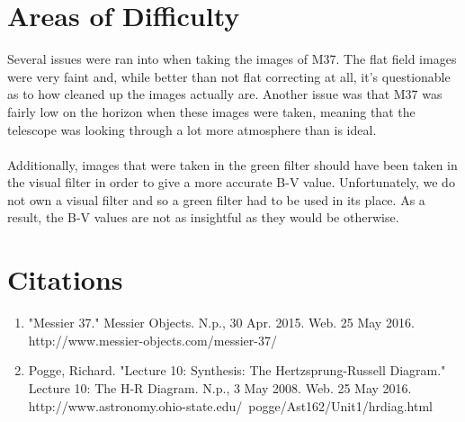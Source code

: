 \documentclass[12pt]{article}
\begin{document}
	
	\section{Areas of Difficulty}
		Several issues were ran into when taking the images of M37. The flat field images were very faint and, while better than not flat correcting at all, it's questionable as to how cleaned up the images actually are. Another issue was that M37 was fairly low on the horizon when these images were taken, meaning that the telescope was looking through a lot more atmosphere than is ideal. 
		\\\\
		Additionally, images that were taken in the green filter should have been taken in the visual filter in order to give a more accurate B-V value. Unfortunately, we do not own a visual filter and so a green filter had to be used in its place. As a result, the B-V values are not as insightful as they would be otherwise.
	
	\section{Citations}
		\begin{enumerate}
			\item "Messier 37." Messier Objects. N.p., 30 Apr. 2015. Web. 25 May 2016. 
			\\http://www.messier-objects.com/messier-37/
			\item Pogge, Richard. "Lecture 10: Synthesis: The Hertzsprung-Russell Diagram." Lecture 10: The H-R Diagram. N.p., 3 May 2008. Web. 25 May 2016. 
			\\ http://www.astronomy.ohio-state.edu/~pogge/Ast162/Unit1/hrdiag.html
		\end{enumerate}
	
\end{document}
